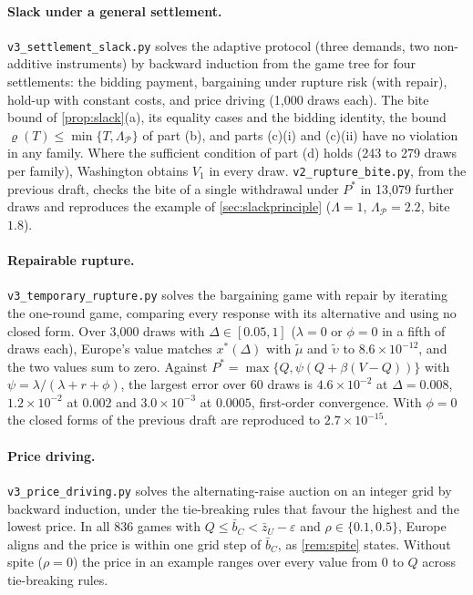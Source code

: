 \paragraph{Slack under a general settlement.} \texttt{v3\_settlement\_slack.py} solves the adaptive protocol (three demands, two non-additive instruments) by backward induction from the game tree for four settlements: the bidding payment, bargaining under rupture risk (with repair), hold-up with constant costs, and price driving (1,000 draws each). The bite bound of \cref{prop:slack}(a), its equality cases and the bidding identity, the bound $\varrho(T)\le\min\{T,\Lambda_{\mathcal P}\}$ of part (b), and parts (c)(i) and (c)(ii) have no violation in any family. Where the sufficient condition of part (d) holds (243 to 279 draws per family), Washington obtains $V_1$ in every draw. \texttt{v2\_rupture\_bite.py}, from the previous draft, checks the bite of a single withdrawal under $P^*$ in 13,079 further draws and reproduces the example of \cref{sec:slackprinciple} ($\Lambda=1$, $\Lambda_{\mathcal P}=2.2$, bite $1.8$).

\paragraph{Repairable rupture.} \texttt{v3\_temporary\_rupture.py} solves the bargaining game with repair by iterating the one-round game, comparing every response with its alternative and using no closed form. Over 3,000 draws with $\Delta\in[0.05,1]$ ($\lambda=0$ or $\phi=0$ in a fifth of draws each), Europe's value matches $x^*(\Delta)$ with $\tilde\mu$ and $\tilde\upsilon$ to $8.6\times10^{-12}$, and the two values sum to zero. Against $P^*=\max\{Q,\psi(Q+\beta(V-Q))\}$ with $\psi=\lambda/(\lambda+r+\phi)$, the largest error over 60 draws is $4.6\times10^{-2}$ at $\Delta=0.008$, $1.2\times10^{-2}$ at $0.002$ and $3.0\times10^{-3}$ at $0.0005$, first-order convergence. With $\phi=0$ the closed forms of the previous draft are reproduced to $2.7\times10^{-15}$.

\paragraph{Price driving.} \texttt{v3\_price\_driving.py} solves the alternating-raise auction on an integer grid by backward induction, under the tie-breaking rules that favour the highest and the lowest price. In all 836 games with $Q\le\bar b_C<\bar z_U-\varepsilon$ and $\rho\in\{0.1,0.5\}$, Europe aligns and the price is within one grid step of $\bar b_C$, as \cref{rem:spite} states. Without spite ($\rho=0$) the price in an example ranges over every value from $0$ to $Q$ across tie-breaking rules.

